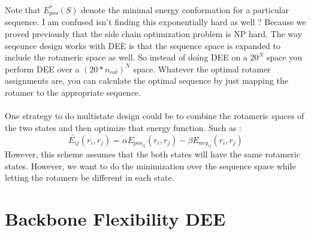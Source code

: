 \documentclass[a4]{article}
\begin{document}
Note that $E_{pos}^*(S)$ denote the minimal energy conformation for a particular sequence. I am confused isn't finding this exponentially hard as well ? Because we proved previously that the side chain optimization problem is NP hard. The way seqeunce design works with DEE is that the sequence space is expanded to include the rotameric space as well. So instead of doing DEE on a $20^N$ space you perform DEE over a $(20*n_{rot})^N$ space. Whatever the optimal rotamer assignments are, you can calculate the optimal sequence by just mapping the rotamer to the appropriate sequence. 
\\
\\
One strategy to do multistate design could be to combine the rotameric spaces of the two states and then optimize that energy function. Such as  : 
\[
\tilde{E_{ij}}(r_i,r_j) = \alpha E_{pos_{ij}}(r_i,r_j) - \beta E_{neg_{ij}}(r_i,r_j)
\]
However, this scheme assumes that the both states will have the same rotameric states. However, we want to do the minimization over the sequence space while letting the rotamers be different in each state. 



\section{Backbone Flexibility DEE}



\end{document}
